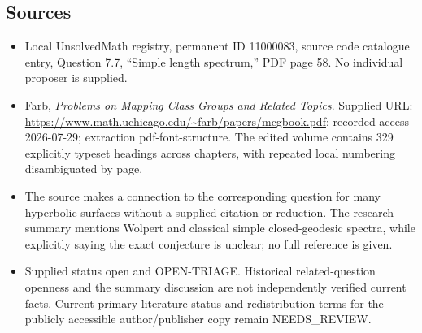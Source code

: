 \documentclass[11pt]{article}
\begin{document}
\subsection{Sources}
\begin{itemize}
\item Local UnsolvedMath registry, permanent ID 11000083, source code catalogue entry, Question 7.7, ``Simple length spectrum,'' PDF page 58. No individual proposer is supplied.
\item Farb, \emph{Problems on Mapping Class Groups and Related Topics}. Supplied URL: \url{https://www.math.uchicago.edu/~farb/papers/mcgbook.pdf}; recorded access 2026-07-29; extraction pdf-font-structure. The edited volume contains 329 explicitly typeset headings across chapters, with repeated local numbering disambiguated by page.
\item The source makes a connection to the corresponding question for many hyperbolic surfaces without a supplied citation or reduction. The research summary mentions Wolpert and classical simple closed-geodesic spectra, while explicitly saying the exact conjecture is unclear; no full reference is given.
\item Supplied status open and OPEN-TRIAGE. Historical related-question openness and the summary discussion are not independently verified current facts. Current primary-literature status and redistribution terms for the publicly accessible author/publisher copy remain NEEDS\_REVIEW.
\end{itemize}
\end{document}
